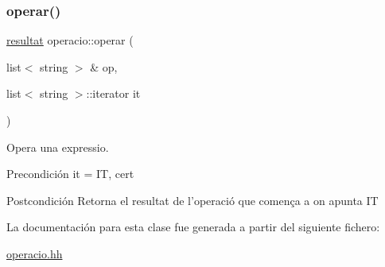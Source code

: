 \subsubsection{\texorpdfstring{operar()}{operar()}}
{\footnotesize\ttfamily \hyperlink{classresultat}{resultat} operacio\+::operar (\begin{DoxyParamCaption}\item[{list$<$ string $>$ \&}]{op,  }\item[{list$<$ string $>$\+::iterator}]{it }\end{DoxyParamCaption})}



Opera una expressio. 

\begin{DoxyPrecond}{Precondición}
it = IT, cert 
\end{DoxyPrecond}
\begin{DoxyPostcond}{Postcondición}
Retorna el resultat de l’operació que comença a on apunta IT 
\end{DoxyPostcond}


La documentación para esta clase fue generada a partir del siguiente fichero\+:\begin{DoxyCompactItemize}
\item 
\hyperlink{operacio_8hh}{operacio.\+hh}\end{DoxyCompactItemize}

